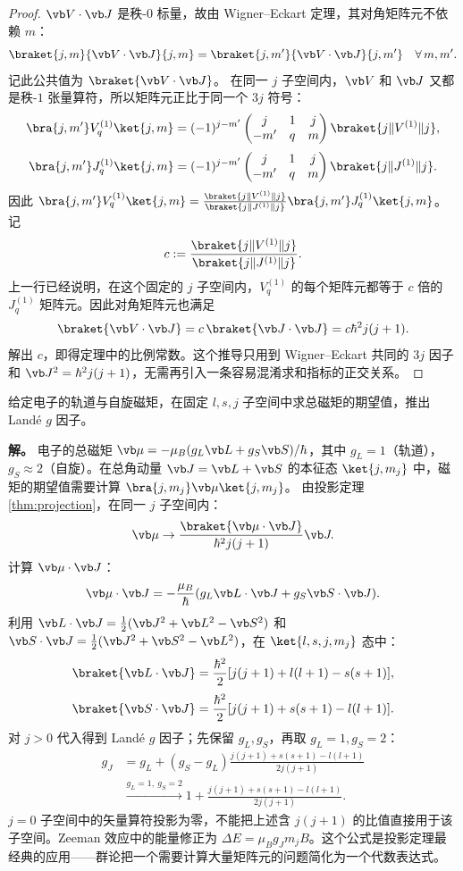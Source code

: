 \begin{proof}
$\vb V\cdot\vb J$ 是秩-$0$ 标量，故由 Wigner--Eckart 定理，其对角矩阵元不依赖 $m$：
\[
\braket{j,m}{\vb V\cdot\vb J}{j,m}=\braket{j,m'}{\vb V\cdot\vb J}{j,m'}\quad\forall\,m,m'.
\]
记此公共值为 $\braket{\vb V\cdot\vb J}$。
在同一 $j$ 子空间内，$\vb V$ 和 $\vb J$ 又都是秩-$1$ 张量算符，所以矩阵元正比于同一个 $3j$ 符号：
\[
\bra{j,m'}V^{(1)}_q\ket{j,m}=(-1)^{j-m'}\begin{pmatrix}j&1&j\\-m'&q&m\end{pmatrix}\braket{j\|V^{(1)}\|j},
\]
\[
\bra{j,m'}J^{(1)}_q\ket{j,m}=(-1)^{j-m'}\begin{pmatrix}j&1&j\\-m'&q&m\end{pmatrix}\braket{j\|J^{(1)}\|j}.
\]
因此 $\bra{j,m'}V^{(1)}_q\ket{j,m}=\frac{\braket{j\|V^{(1)}\|j}}{\braket{j\|J^{(1)}\|j}}\bra{j,m'}J^{(1)}_q\ket{j,m}$。
记
\[
c:=\frac{\braket{j\|V^{(1)}\|j}}{\braket{j\|J^{(1)}\|j}}.
\]
上一行已经说明，在这个固定的 $j$ 子空间内，$V^{(1)}_q$ 的每个矩阵元都等于 $c$ 倍的 $J^{(1)}_q$ 矩阵元。因此对角矩阵元也满足
\[
\braket{\vb V\cdot\vb J}
=c\,\braket{\vb J\cdot\vb J}
=c\hbar^2j(j+1).
\]
解出 $c$，即得定理中的比例常数。这个推导只用到 Wigner--Eckart 共同的 $3j$ 因子和 $\vb J^2=\hbar^2j(j+1)$，无需再引入一条容易混淆求和指标的正交关系。
\end{proof}
\begin{example}[{Land\'e $g$ 因子}]
给定电子的轨道与自旋磁矩，在固定 $l,s,j$ 子空间中求总磁矩的期望值，推出 Land\'e $g$ 因子。

\textbf{解。} 电子的总磁矩 $\vb\mu=-\mu_B(g_L\vb L+g_S\vb S)/\hbar$，其中 $g_L=1$（轨道），$g_S\approx2$（自旋）。在总角动量 $\vb J=\vb L+\vb S$ 的本征态 $\ket{j,m_j}$ 中，磁矩的期望值需要计算 $\bra{j,m_j}\vb\mu\ket{j,m_j}$。
由投影定理 \cref{thm:projection}，在同一 $j$ 子空间内：
\[
\vb\mu\to\frac{\braket{\vb\mu\cdot\vb J}}{\hbar^2 j(j+1)}\vb J.
\]
计算 $\vb\mu\cdot\vb J$：
\[
\vb\mu\cdot\vb J=-\frac{\mu_B}{\hbar}(g_L\vb L\cdot\vb J+g_S\vb S\cdot\vb J).
\]
利用 $\vb L\cdot\vb J=\frac12(\vb J^2+\vb L^2-\vb S^2)$ 和 $\vb S\cdot\vb J=\frac12(\vb J^2+\vb S^2-\vb L^2)$，在 $\ket{l,s,j,m_j}$ 态中：
\[
\braket{\vb L\cdot\vb J}=\frac{\hbar^2}{2}[j(j+1)+l(l+1)-s(s+1)],
\]
\[
\braket{\vb S\cdot\vb J}=\frac{\hbar^2}{2}[j(j+1)+s(s+1)-l(l+1)].
\]
对 $j>0$ 代入得到 Land\'e $g$ 因子；先保留 $g_L,g_S$，再取 $g_L=1,g_S=2$：
\begin{equation}
\begin{aligned}
 g_J&=g_L+(g_S-g_L)\frac{j(j+1)+s(s+1)-l(l+1)}{2j(j+1)}\\
 &\xrightarrow{g_L=1,\ g_S=2}
 1+\frac{j(j+1)+s(s+1)-l(l+1)}{2j(j+1)}.
\end{aligned}
\label{eq:lande-g}
\end{equation}
$j=0$ 子空间中的矢量算符投影为零，不能把上述含 $j(j+1)$ 的比值直接用于该子空间。Zeeman 效应中的能量修正为 $\Delta E=\mu_B g_J m_j B$。这个公式是投影定理最经典的应用——群论把一个需要计算大量矩阵元的问题简化为一个代数表达式。
\end{example}
